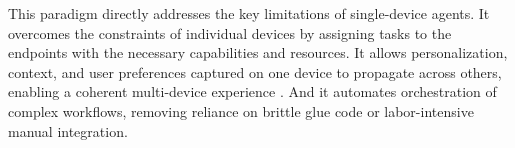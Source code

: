 \documentclass[10pt]{article} %
\newcommand{\ufo}{\textsc{UFO}$^3$\xspace}
\begin{document}
This paradigm directly addresses the key limitations of single-device agents. It overcomes the constraints of individual devices by assigning tasks to the endpoints with the necessary capabilities and resources. It allows personalization, context, and user preferences captured on one device to propagate across others, enabling a coherent multi-device experience \cite{giusti2025federation}. And it automates orchestration of complex workflows, removing reliance on brittle glue code or labor-intensive manual integration.

\end{document}
